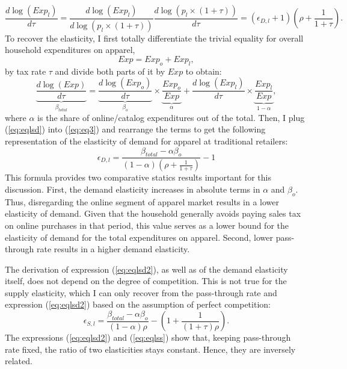 \documentclass[12pt]{article}
\begin{document}
			
			\begin{equation}	
			\label{eq:eqlsd}
			\frac{d \log(Exp_{l})}{d\tau}=\frac{d \log(Exp_{l})}{d \log (p_{l}\times (1+\tau))} \frac{d \log (p_{l}\times (1+\tau))}{d\tau}=(\epsilon_{D,l}+1)(\rho+\frac{1}{1+\tau}).
			\end{equation}
			To recover the elasticity, I first totally differentiate the trivial equality for overall household expenditures on apparel,
			\begin{equation}
			\label{eq:exp}	
			Exp=Exp_o+Exp_{l},
			\end{equation}
			by tax rate $\tau$ and divide both parts of it by $Exp$ to obtain:	
			\begin{equation}
			\label{eq:eq3}
			\underbrace{\frac{d \log(Exp)}{d\tau}}_{\beta_{total}}=\underbrace{\frac{d \log(Exp_o)}{d\tau}}_{\beta_{o}} \times \underbrace{\frac{Exp_o}{Exp}}_{\alpha} + \frac{d 			\log(Exp_{l})}{d\tau}\times \underbrace{\frac{Exp_{l}}{Exp}}_{1-\alpha}, 
			\end{equation}
			where $\alpha$ is the share of online/catalog expenditures out of the total. 
			Then, I plug (\ref{eq:eqlsd}) into (\ref{eq:eq3}) and rearrange the terms to get the following representation of the elasticity of demand for apparel at traditional retailers:
			\begin{equation}	
			\label{eq:eqlsd2}
			\epsilon_{D,l}=\frac{\beta_{total}-\alpha \beta_{o}}{(1-\alpha)(\rho+\frac{1}{1+\tau})}-1
			\end{equation}
			This formula provides two comparative statics results important for this discussion. First, the demand elasticity increases in absolute terms in $\alpha$ and $\beta_{o}$. Thus, disregarding the online segment of apparel market results in a lower elasticity of demand. Given that the household generally avoids paying sales tax on online purchases in that period, this value serves as a lower bound for the elasticity of demand for the total expenditures on apparel.  Second, lower pass-through rate results in a higher demand elasticity.
			
			The derivation of expression (\ref{eq:eqlsd2}), as well as of the demand elasticity itself, does not depend on the degree of competition. This is not true for the supply elasticity, which I can only recover from the pass-through rate and expression (\ref{eq:eqlsd2}) based on the assumption of perfect competition:
			\begin{equation}
			\label{eq:eqlss}
			\epsilon_{S,l}=\frac{\beta_{total}-\alpha \beta_{o}}{(1-\alpha)\rho}-(1+\frac{1}{(1+\tau)\rho}).
			\end{equation}
			The expressions (\ref{eq:eqlsd2}) and (\ref{eq:eqlss}) show that, keeping pass-through rate fixed, the ratio of two elasticities stays constant. Hence, they are inversely related.
\end{document}
